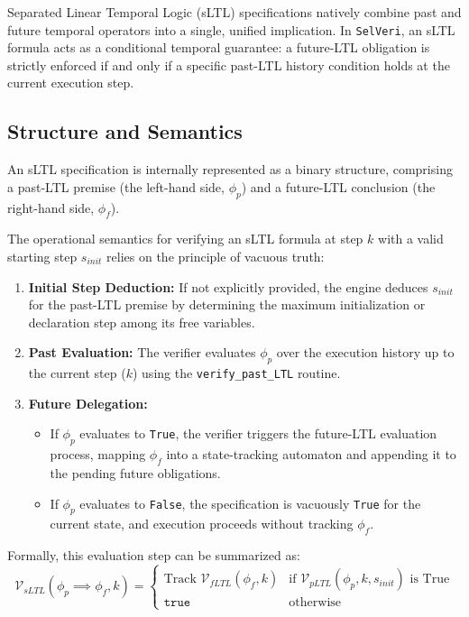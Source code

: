 \documentclass{article}
\begin{document}
Separated Linear Temporal Logic (sLTL) specifications natively combine past and future temporal operators into a single, unified implication. In \texttt{SelVeri}, an sLTL formula acts as a conditional temporal guarantee: a future-LTL obligation is strictly enforced if and only if a specific past-LTL history condition holds at the current execution step.

\subsection{Structure and Semantics}
An sLTL specification is internally represented as a binary structure, comprising a past-LTL premise (the left-hand side, $\phi_p$) and a future-LTL conclusion (the right-hand side, $\phi_f$). 

The operational semantics for verifying an sLTL formula at step $k$ with a valid starting step $s_{init}$ relies on the principle of vacuous truth:
\begin{enumerate}
    \item \textbf{Initial Step Deduction:} If not explicitly provided, the engine deduces $s_{init}$ for the past-LTL premise by determining the maximum initialization or declaration step among its free variables.
    \item \textbf{Past Evaluation:} The verifier evaluates $\phi_p$ over the execution history up to the current step ($k$) using the \texttt{verify\_past\_LTL} routine.
    \item \textbf{Future Delegation:} 
    \begin{itemize}
        \item If $\phi_p$ evaluates to \texttt{True}, the verifier triggers the future-LTL evaluation process, mapping $\phi_f$ into a state-tracking automaton and appending it to the pending future obligations.
        \item If $\phi_p$ evaluates to \texttt{False}, the specification is vacuously \texttt{True} for the current state, and execution proceeds without tracking $\phi_f$.
    \end{itemize}
\end{enumerate}

Formally, this evaluation step can be summarized as:
\[
\mathcal{V}_{sLTL}(\phi_p \implies \phi_f, k) = 
\begin{cases} 
  \text{Track } \mathcal{V}_{fLTL}(\phi_f, k) & \text{if } \mathcal{V}_{pLTL}(\phi_p, k, s_{init}) \text{ is True} \\
  \texttt{true} & \text{otherwise}
\end{cases}
\]
\end{document}

